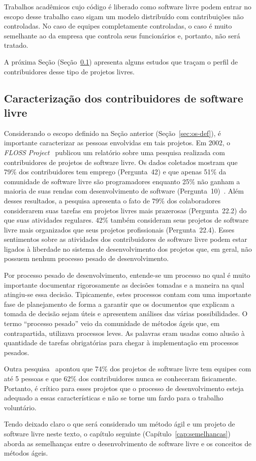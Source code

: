 Trabalhos acadêmicos cujo código é liberado como software livre podem
entrar no escopo desse trabalho caso sigam um modelo distribuído com
contribuições não controladas. No caso de equipes completamente
controladas, o caso é muito semelhante ao da empresa que controla seus
funcionários e, portanto, não será tratado.

A próxima Seção (Seção~\ref{subsec:caracterizacao}) apresenta alguns
estudos que traçam o perfil de contribuidores desse tipo de projetos
livres.


\subsection{Caracterização dos contribuidores de software livre}
\label{subsec:caracterizacao}

Considerando o escopo definido na Seção anterior
(Seção~\ref{sec:os-def}), é importante caracterizar as pessoas
envolvidas em tais projetos. Em 2002, o \emph{FLOSS
  Project}~\cite{FlossProject} publicou um relatório sobre uma
pesquisa realizada com contribuidores de projetos de software
livre. Os dados coletados mostram que 79\% dos contribuidores tem
emprego (Pergunta~42) e que apenas 51\% da comunidade de software
livre são programadores enquanto 25\% não ganham a maioria de suas
rendas com desenvolvimento de software
(Pergunta~10)~\cite{FlossStats}. Além desses resultados, a pesquisa
apresenta o fato de 79\% dos colaboradores considerarem suas tarefas
em projetos livres mais prazerosas (Pergunta~22.2) do que suas
atividades regulares. 42\% também consideram seus projetos de software
livre mais organizados que seus projetos profissionais
(Pergunta~22.4).  Esses sentimentos sobre as atividades dos
contribuidores de software livre podem estar ligados à liberdade no
sistema de desenvolvimento dos projetos que, em geral, não possuem
nenhum processo pesado de desenvolvimento.

Por processo pesado de desenvolvimento, entende-se um processo no qual
é muito importante documentar rigorosamente as decisões tomadas e a
maneira na qual atingiu-se essa decisão. Tipicamente, estes processos
contam com uma importante fase de planejamento de forma a garantir que
os documentos que explicam a tomada de decisão sejam úteis e
apresentem análises das várias possibilidades. O termo ``processo
pesado'' veio da comunidade de métodos ágeis que, em contrapartida,
utilizava processos leves. As palavras eram usadas como alusão à
quantidade de tarefas obrigatórias para chegar à implementação em
processos pesados.

Outra pesquisa~\cite{Reis2003} apontou que 74\% dos projetos de
software livre tem equipes com até 5 pessoas e que 62\% dos
contribuidores nunca se conheceram fisicamente. Portanto, é crítico
para esses projetos que o processo de desenvolvimento esteja adequado
a essas características e não se torne um fardo para o trabalho
voluntário.

Tendo deixado claro o que será considerado um método ágil e um projeto
de software livre neste texto, o capítulo seguinte
(Capítulo~\ref{cap:semelhancas}) aborda as semelhanças entre o
desenvolvimento de software livre e os conceitos de métodos ágeis.

